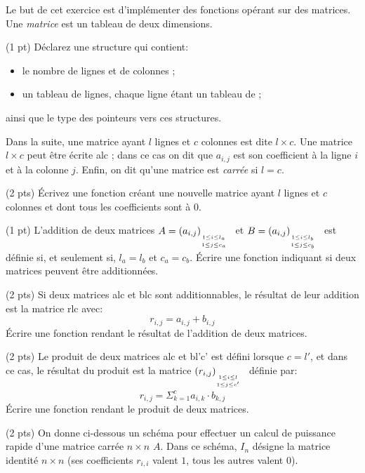 




Le but de cet exercice est d'impl{\'e}menter des fonctions op{\'e}rant sur des
matrices. Une \emph{matrice} est un tableau de  deux
dimensions. 

\question (1 pt) D{\'e}clarez une structure  qui
contient:
\begin{itemize}
\item le nombre de lignes et de colonnes ;
\item un tableau de lignes, chaque ligne {\'e}tant un tableau de \cfloat ;
\end{itemize}
ainsi que le type  des pointeurs vers ces
structures. 

Dans la suite, une matrice ayant $l$ lignes et $c$ colonnes est dite
$l\times c$. Une matrice $l\times c$ peut {\^e}tre {\'e}crite
\matrice alc ; dans ce cas on dit que $a_{i,j}$ est son coefficient
{\`a} la ligne $i$ et {\`a} la colonne $j$. Enfin, on dit qu'une matrice est
\emph{carr{\'e}e} si $l = c$.


\question (2 pts) {\'E}crivez une fonction  cr{\'e}ant une
nouvelle matrice ayant $l$ lignes et $c$ colonnes et dont tous les
coefficients sont {\`a} $0$.

\question (1 pt) L'addition de deux matrices $A=\matrice a{l_a}{c_a}$
et $B=\matrice a{l_b}{c_b}$ est d{\'e}finie si, et seulement si, $l_a=l_b$
et $c_a=c_b$. {\'E}crire une fonction indiquant si deux matrices peuvent
{\^e}tre additionn{\'e}es.

\question (2 pts) Si deux matrices \matrice alc et \matrice blc sont
additionnables, le r{\'e}sultat de leur addition est la matrice \matrice
rlc avec:
$$
r_{i,j}=a_{i,j}+b_{i,j}
$$
{\'E}crire une fonction rendant le r{\'e}sultat de l'addition de deux matrices.


\question (2 pts) Le produit de deux matrices \matrice alc et \matrice
b{l'}{c'} est d{\'e}fini lorsque $c=l'$, et dans ce cas, le r{\'e}sultat du
produit est la matrice $\matrice rl{c'}$ d{\'e}finie par:
$$
r_{i,j} = \Sigma_{k=1}^c a_{i,k} \cdot b_{k,j}
$$
{\'E}crire une fonction rendant le produit de deux matrices.

\question (2 pts) On donne ci-dessous un sch{\'e}ma pour effectuer un
calcul de puissance rapide d'une matrice carr{\'e}e $n\times n$  $A$. Dans
ce sch{\'e}ma, $I_n$ d{\'e}signe la matrice identit{\'e} $n\times n$ (ses
coefficients $r_{i,i}$ valent $1$, tous les autres valent $0$).


